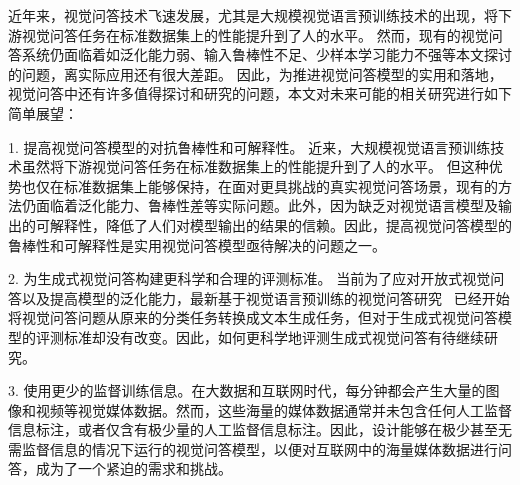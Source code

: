 
近年来，视觉问答技术飞速发展，尤其是大规模视觉语言预训练技术的出现，将下游视觉问答任务在标准数据集上的性能提升到了人的水平。
然而，现有的视觉问答系统仍面临着如泛化能力弱、输入鲁棒性不足、少样本学习能力不强等本文探讨的问题，离实际应用还有很大差距。
因此，为推进视觉问答模型的实用和落地，视觉问答中还有许多值得探讨和研究的问题，本文对未来可能的相关研究进行如下简单展望：


1. 提高视觉问答模型的对抗鲁棒性和可解释性。
近来，大规模视觉语言预训练技术虽然将下游视觉问答任务在标准数据集上的性能提升到了人的水平。
但这种优势也仅在标准数据集上能够保持，在面对更具挑战的真实视觉问答场景，现有的方法仍面临着泛化能力、鲁棒性差等实际问题。此外，因为缺乏对视觉语言模型及输出的可解释性，降低了人们对模型输出的结果的信赖。因此，提高视觉问答模型的鲁棒性和可解释性是实用视觉问答模型亟待解决的问题之一。

2. 为生成式视觉问答构建更科学和合理的评测标准。
当前为了应对开放式视觉问答以及提高模型的泛化能力，最新基于视觉语言预训练的视觉问答研究~\cite{cho2021unifying,wang2022simvlm} 已经开始将视觉问答问题从原来的分类任务转换成文本生成任务，但对于生成式视觉问答模型的评测标准却没有改变。因此，如何更科学地评测生成式视觉问答有待继续研究。

3. 使用更少的监督训练信息。在大数据和互联网时代，每分钟都会产生大量的图像和视频等视觉媒体数据。然而，这些海量的媒体数据通常并未包含任何人工监督信息标注，或者仅含有极少量的人工监督信息标注。因此，设计能够在极少甚至无需监督信息的情况下运行的视觉问答模型，以便对互联网中的海量媒体数据进行问答，成为了一个紧迫的需求和挑战。



